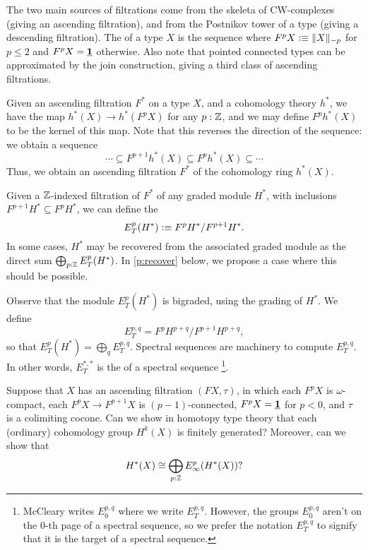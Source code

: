 \documentclass[reqno]{amsart}
\begin{document}
The two main sources of filtrations come from the skeleta of CW-complexes
(giving an ascending filtration), and from the Postnikov tower of a type
(giving a descending filtration). The  of a type $X$ is the
sequence where $F^pX\defeq \trunc{-p}{X}$ for $p\leq 2$ and $F^pX=\unit$ otherwise. 
Also note that pointed connected types
can be approximated by the join construction, giving a third class of ascending filtrations.

Given an ascending filtration $F^\ast$ on a type $X$, and a cohomology theory $h^\ast$, 
we have the map $h^\ast(X)\to h^\ast(F^pX)$ for any $p:\Z$, and we
may define $F^{p}h^\ast(X)$ to be the kernel of this map. 
Note that this reverses the direction of the sequence: we obtain a sequence
\begin{equation*}
\cdots \subseteq F^{p+1}h^\ast(X) \subseteq F^ph^\ast(X) \subseteq \cdots
\end{equation*}
Thus, we obtain an ascending filtration $F^\ast$ of the cohomology ring $h^\ast(X)$. 

Given a $\Z$-indexed filtration of $F^\ast$ of any graded module $H^\ast$, with inclusions
$F^{p+1}H^\ast\subseteq F^{p}H^\ast$, we can define the 
\begin{equation*}
E_T^p(H^\ast)\defeq F^pH^\ast/F^{p+1}H^\ast.
\end{equation*}
In some cases, $H^\ast$ may be recovered from the associated graded module as the direct sum
$\bigoplus_{p:\Z} E_T^p(H^\ast)$.
In \autoref{p:recover} below, we propose a case where this should be possible.

Observe that the module $E^p_T(H^\ast)$ is bigraded, using the
grading of $H^\ast$. We define
\begin{equation*}
E^{p,q}_T=F^pH^{p+q}/F^{p+1}H^{p+q},
\end{equation*}
so that $E_T^p(H^\ast)=\bigoplus_q E_T^{p,q}$.
Spectral sequences are machinery to compute $E^{p,q}_T$. In other words,
$E_T^{\ast,\ast}$ is the  of a spectral sequence%
\footnote{McCleary \cite{McCleary01} writes $E_0^{p,q}$ where we write $E_T^{p,q}$.
However, the groups $E_0^{p,q}$ aren't on the $0$-th page of a spectral sequence,
so we prefer the notation $E_T^{p,q}$ to signify that it is the target of a spectral sequence.}.

\begin{proposal}\label{p:recover}
Suppose that $X$ has an ascending filtration $(FX,\tau)$, in which each $F^pX$ is $\omega$-compact, each
$F^pX \to F^{p+1}X$ is $(p-1)$-connected, $F^pX=\unit$ for $p<0$, and $\tau$ is a colimiting cocone.
Can we show in homotopy type theory that each (ordinary) cohomology group $H^k(X)$ is finitely generated? Moreover,
can we show that
\begin{equation*}
H^\ast(X)\cong \bigoplus_{p:\Z} E^p_\infty(H^\ast(X))?
\end{equation*}
\end{proposal}
\end{document}
